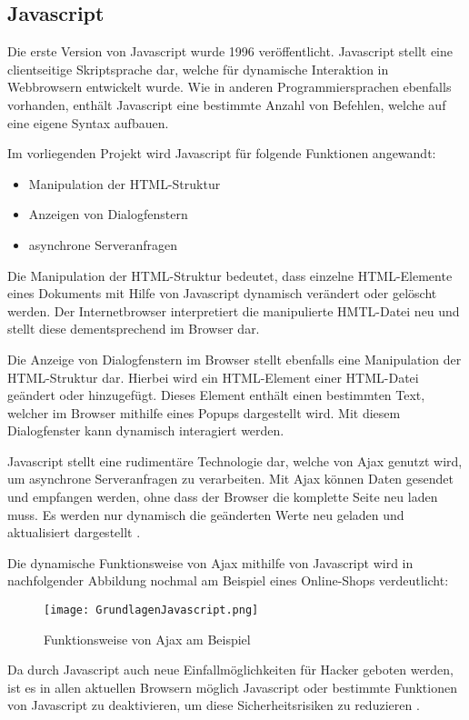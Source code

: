 \subsection{Javascript}
\label{sec:Javascript}

Die erste Version von Javascript wurde 1996 veröffentlicht. Javascript stellt eine clientseitige Skriptsprache dar, welche für dynamische Interaktion in Webbrowsern entwickelt wurde. Wie in anderen Programmiersprachen ebenfalls vorhanden, enthält Javascript eine bestimmte Anzahl von Befehlen, welche auf eine eigene Syntax aufbauen.

Im vorliegenden Projekt wird Javascript für folgende Funktionen angewandt:

\begin{itemize}
  \item Manipulation der HTML-Struktur
  \item Anzeigen von Dialogfenstern
  \item asynchrone Serveranfragen
\end{itemize}

Die Manipulation der HTML-Struktur bedeutet, dass einzelne HTML-Elemente eines Dokuments mit Hilfe von Javascript dynamisch verändert oder gelöscht werden. Der Internetbrowser interpretiert die manipulierte HMTL-Datei neu und stellt diese dementsprechend im Browser dar.

Die Anzeige von Dialogfenstern im Browser stellt ebenfalls eine Manipulation der HTML-Struktur dar. Hierbei wird ein HTML-Element einer HTML-Datei geändert oder hinzugefügt. Dieses Element enthält einen bestimmten Text, welcher im Browser mithilfe eines Popups dargestellt wird. Mit diesem Dialogfenster kann dynamisch interagiert werden.

Javascript stellt eine rudimentäre Technologie dar, welche von Ajax genutzt wird, um asynchrone Serveranfragen zu verarbeiten. Mit Ajax können Daten gesendet und empfangen werden, ohne dass der Browser die komplette Seite neu laden muss. Es werden nur dynamisch die geänderten Werte neu geladen und aktualisiert dargestellt .

Die dynamische Funktionsweise von Ajax mithilfe von Javascript wird in nachfolgender Abbildung nochmal am Beispiel eines Online-Shops verdeutlicht:

\begin{figure}[htb]
\centering
\texttt{[image: GrundlagenJavascript.png]}
\caption[Grundlagen Javascript]{Funktionsweise von Ajax am Beispiel\protect\footnotemark}
\label{fig:Bildergalerie}
\end{figure}

Da durch Javascript auch neue Einfallmöglichkeiten für Hacker geboten werden, ist es in allen aktuellen Browsern möglich Javascript oder bestimmte Funktionen von Javascript zu deaktivieren, um diese Sicherheitsrisiken zu reduzieren .